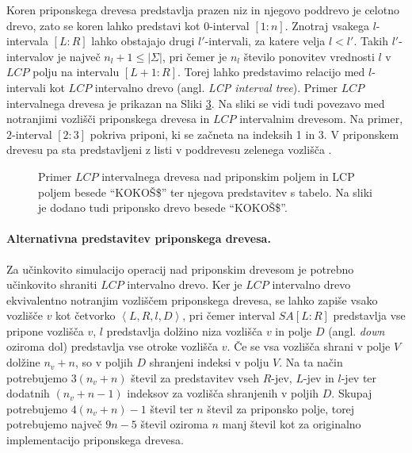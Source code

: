 Koren priponskega drevesa predstavlja prazen niz in njegovo poddrevo je celotno drevo, zato se koren lahko predstavi kot $0$-interval $[1:n]$. Znotraj vsakega $l$-intervala $[L:R]$ lahko obstajajo drugi $l'$-intervali, za katere velja $l<l'$. Takih $l'$-intervalov je največ $n_l+1\le |\Sigma|$, pri čemer je $n_l$ število ponovitev vrednosti $l$ v $LCP$ polju na intervalu $[L+1:R]$. Torej lahko predstavimo relacijo med $l$-intervali kot $LCP$ intervalno drevo (angl. \textit{LCP interval tree}). Primer $LCP$ intervalnega drevesa je prikazan na Sliki \ref{fig:intervalTree}. Na sliki se vidi tudi povezavo med notranjimi vozlišči priponskega drevesa in $LCP$ intervalnim drevesom. Na primer, $2$-interval $[2:3]$ pokriva priponi, ki se začneta na indeksih 1 in 3. V priponskem drevesu pa sta predstavljeni z listi v poddrevesu zelenega vozlišča \cite{Abouelhoda2004}.

\begin{figure}[tb]
    \begin{subfigure}[C]{0.45\linewidth}
        \vfill       
        
        \centering
        \vfill
        \subcaption*{}
        \label{fig:aSADrevo}
    \end{subfigure}
    \hfill
    \begin{subfigure}[C]{0.45\linewidth}        
        
        \centering
        \subcaption*{}
        \label{fig:aSAPolje}
    \end{subfigure}
   
    \caption{Primer $LCP$ intervalnega drevesa nad priponskim poljem in LCP poljem besede \enquote{KOKOŠ\$} ter njegova predstavitev s tabelo. Na sliki je dodano tudi priponsko drevo besede \enquote{KOKOŠ\$}.} 
    \label{fig:intervalTree}
\end{figure}

\paragraph{Alternativna predstavitev priponskega drevesa.}

Za učinkovito simulacijo operacij nad priponskim drevesom je potrebno učinkovito shraniti $LCP$ intervalno drevo. Ker je $LCP$ intervalno drevo ekvivalentno notranjim vozliščem priponskega drevesa, se lahko zapiše vsako vozlišče $v$ kot četvorko $\left< L, R, l, D \right>$, pri čemer interval $SA[L:R]$ predstavlja vse pripone vozlišča $v$, $l$ predstavlja dolžino niza vozlišča $v$ in polje $D$ (angl. \textit{down} oziroma dol) predstavlja vse otroke vozlišča $v$. Če se vsa vozlišča shrani v polje $V$ dolžine $n_v+n$, so v poljih $D$ shranjeni indeksi v polju $V$. Na ta način potrebujemo $3(n_v+n)$ števil za predstavitev vseh $R$-jev, $L$-jev in $l$-jev ter dodatnih $(n_v+n-1)$ indeksov za vozlišča shranjenih v poljih $D$. Skupaj potrebujemo $4(n_v+n)-1$ števil ter $n$ števil za priponsko polje, torej potrebujemo največ $9n-5$ števil oziroma $n$ manj števil kot za originalno implementacijo priponskega drevesa. 

